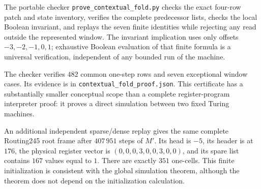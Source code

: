 The portable checker \texttt{prove\_contextual\_fold.py} checks the exact
four-row patch and state inventory, verifies the complete predecessor
lists, checks the local Boolean invariant, and replays the seven finite
identities while rejecting any read outside the represented window.
The invariant implication uses only offsets $-3,-2,-1,0,1$; exhaustive
Boolean evaluation of that finite formula is a universal verification,
independent of any bounded run of the machine.

The checker verifies $482$ common one-step rows and seven exceptional
window cases.  Its evidence is in \texttt{contextual\_fold\_proof.json}.
This certificate has a substantially smaller conceptual scope than a
complete register-program interpreter proof: it proves a direct
simulation between two fixed Turing machines.

An additional independent sparse/dense replay gives the same complete
Routing245 root frame after $407\,951$ steps of $M'$.  Its head is $-5$,
its header is at $176$, the physical register vector is
$(0,0,0,3,0,0,3,0,0)$, and its spare list contains $167$ values equal to
$1$.  There are exactly $351$ one-cells.  This finite initialization is
consistent with the global simulation theorem, although the theorem
does not depend on the initialization calculation.
